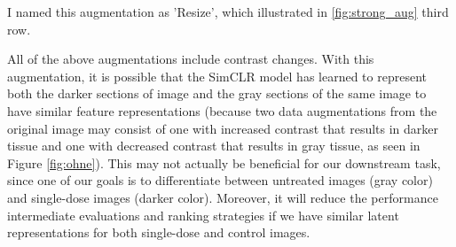 I named this augmentation as 'Resize', which illustrated in \ref{fig:strong_aug} third row.


All of the above augmentations include contrast changes. With this augmentation, it is possible that the SimCLR model has learned to represent both the darker sections of image and the gray sections of the same image to have similar feature representations (because two data augmentations from the original image may consist of one with increased contrast that results in darker tissue and one with decreased contrast that results in gray tissue, as seen in Figure \ref{fig:ohne}). This may not actually be beneficial for our downstream task, since one of our goals is to differentiate between untreated images (gray color) and single-dose images (darker color). Moreover, it will reduce the performance intermediate evaluations and ranking strategies if we  have similar latent representations for both single-dose and control images.

